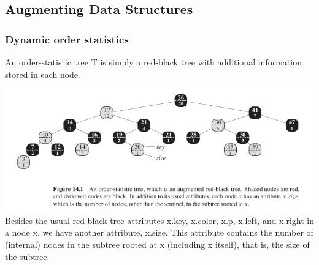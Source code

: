 \documentclass[11pt]{article}
\begin{document}
\subsection{Augmenting Data Structures}
\label{sec-4-5}

\subsubsection{Dynamic order statistics}
\label{sec-4-5-1}
An order-statistic tree T is simply a red-black tree with additional information stored in each node. \\

\includegraphics[width=.9\linewidth]{pics/c14_os_tree.png} \\
Besides the usual red-black tree attributes x.key, x.color, x.p, x.left, and x.right in a node x, we have another attribute, x.size. This attribute contains the number of (internal) nodes in the subtree rooted at x (including x itself), that is, the size of the subtree. \\
\end{document}
